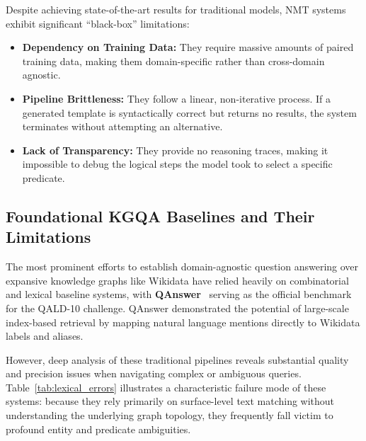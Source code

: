 Despite achieving state-of-the-art results for traditional models, NMT systems exhibit significant ``black-box'' limitations:
\begin{itemize}
    \item \textbf{Dependency on Training Data:} They require massive amounts of paired training data, making them domain-specific rather than cross-domain agnostic.
    \item \textbf{Pipeline Brittleness:} They follow a linear, non-iterative process. If a generated template is syntactically correct but returns no results, the system terminates without attempting an alternative.
    \item \textbf{Lack of Transparency:} They provide no reasoning traces, making it impossible to debug the logical steps the model took to select a specific predicate.
\end{itemize}

\subsection{Foundational KGQA Baselines and Their Limitations}
\label{sec:baseline_limitations}

The most prominent efforts to establish domain-agnostic question answering over expansive knowledge graphs like Wikidata have relied heavily on combinatorial and lexical baseline systems, with \textbf{QAnswer}~\cite{diefenbach2019qanswer} serving as the official benchmark for the QALD-10 challenge. QAnswer demonstrated the potential of large-scale index-based retrieval by mapping natural language mentions directly to Wikidata labels and aliases. 

However, deep analysis of these traditional pipelines reveals substantial quality and precision issues when navigating complex or ambiguous queries. Table~\ref{tab:lexical_errors} illustrates a characteristic failure mode of these systems: because they rely primarily on surface-level text matching without understanding the underlying graph topology, they frequently fall victim to profound entity and predicate ambiguities.

